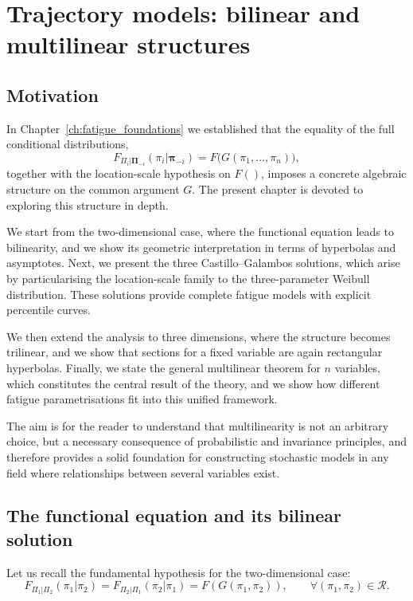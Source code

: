 \startcontents[chapter]
\chapter{Trajectory models: bilinear and multilinear structures}
\label{ch:trajectory_models}
\minitocboxed

\section*{Motivation}

In Chapter~\ref{ch:fatigue_foundations} we established that the equality of the full conditional distributions,
\[
F_{\Pi_i|\boldsymbol{\Pi}_{-i}}(\pi_i|\boldsymbol{\pi}_{-i}) = F\bigl(G(\pi_1,\ldots,\pi_n)\bigr),
\]
together with the location-scale hypothesis on $F()$, imposes a concrete algebraic structure on the common argument \(G\). The present chapter is devoted to exploring this structure in depth.

We start from the two-dimensional case, where the functional equation leads to bilinearity, and we show its geometric interpretation in terms of hyperbolas and asymptotes. Next, we present the three Castillo–Galambos solutions, which arise by particularising the location-scale family to the three-parameter Weibull distribution. These solutions provide complete fatigue models with explicit percentile curves.

We then extend the analysis to three dimensions, where the structure becomes trilinear, and we show that sections for a fixed variable are again rectangular hyperbolas. Finally, we state the general multilinear theorem for \(n\) variables, which constitutes the central result of the theory, and we show how different fatigue parametrisations fit into this unified framework.

The aim is for the reader to understand that multilinearity is not an arbitrary choice, but a necessary consequence of probabilistic and invariance principles, and therefore provides a solid foundation for constructing stochastic models in any field where relationships between several variables exist.

\section{The functional equation and its bilinear solution}
\label{sec:functional-equation-2D}

Let us recall the fundamental hypothesis for the two-dimensional case:
\[
F_{\Pi_1|\Pi_2}(\pi_1|\pi_2) = F_{\Pi_2|\Pi_1}(\pi_2|\pi_1) = F\!\left(G(\pi_1,\pi_2)\right), \qquad \forall (\pi_1,\pi_2)\in\mathcal{R}.
\]

